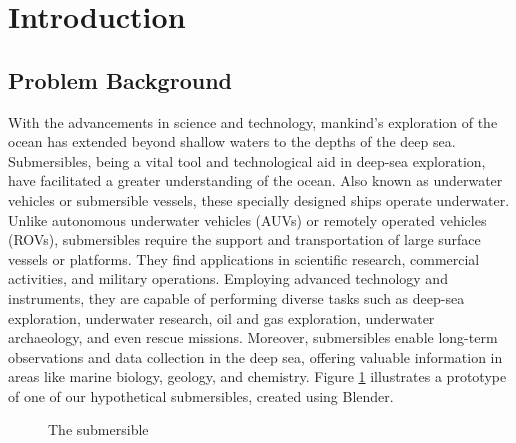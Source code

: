 \documentclass[12pt]{article}
\begin{document}
\begin{center}
    \tableofcontents
\end{center}

\newpage
\setcounter{page}{1}

\section{Introduction}

\subsection{Problem Background}

With the advancements in science and technology, mankind's exploration of the ocean has extended beyond shallow waters to the depths of the deep sea. Submersibles, being a vital tool and technological aid in deep-sea exploration, have facilitated a greater understanding of the ocean. Also known as underwater vehicles or submersible vessels, these specially designed ships operate underwater. Unlike autonomous underwater vehicles (AUVs) or remotely operated vehicles (ROVs), submersibles require the support and transportation of large surface vessels or platforms. They find applications in scientific research, commercial activities, and military operations. Employing advanced technology and instruments, they are capable of performing diverse tasks such as deep-sea exploration, underwater research, oil and gas exploration, underwater archaeology, and even rescue missions. Moreover, submersibles enable long-term observations and data collection in the deep sea, offering valuable information in areas like marine biology, geology, and chemistry. Figure \ref{fig:unmanned_submersible} illustrates a prototype of one of our hypothetical submersibles, created using Blender.

\begin{figure}[h!]
    \centering
    \label{fig:unmanned_submersible}

    \caption{The submersible}
\end{figure}
\end{document}
